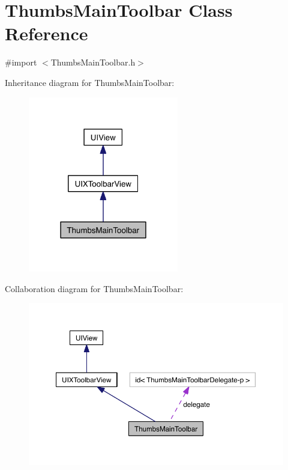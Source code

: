 \hypertarget{interface_thumbs_main_toolbar}{\section{Thumbs\-Main\-Toolbar Class Reference}
\label{df/db1/interface_thumbs_main_toolbar}
}


{\ttfamily \#import $<$Thumbs\-Main\-Toolbar.\-h$>$}



Inheritance diagram for Thumbs\-Main\-Toolbar\-:
\nopagebreak
\begin{figure}[H]
\begin{center}
\leavevmode
\includegraphics[width=186pt]{d1/d1c/interface_thumbs_main_toolbar__inherit__graph}
\end{center}
\end{figure}


Collaboration diagram for Thumbs\-Main\-Toolbar\-:
\nopagebreak
\begin{figure}[H]
\begin{center}
\leavevmode
\includegraphics[width=350pt]{d5/d95/interface_thumbs_main_toolbar__coll__graph}
\end{center}
\end{figure}
